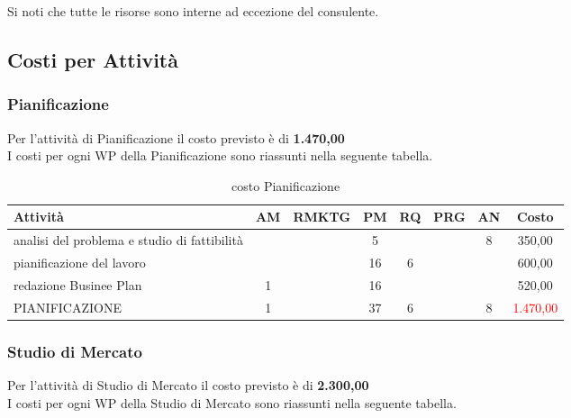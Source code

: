 Si noti che tutte le risorse sono interne ad eccezione del consulente. 











\subsection{Costi per Attività}

	

\subsubsection{Pianificazione}
Per l'attività di Pianificazione il costo previsto è di \textbf{ \text{\euro}1.470,00 }\\	
I costi per ogni WP della Pianificazione sono riassunti nella seguente tabella.
\begin{table}[!h]
\centering
\begin{tabular}{|l|c|c|c|c|c|c|c|}
\hline
\textbf{Attività}& \textbf{AM} & \textbf{RMKTG} & \textbf{PM} & \textbf{RQ} & \textbf{PRG} & \textbf{AN} & \textbf{Costo}  \\ 
              
\hline
analisi del problema e studio di fattibilità  & & & 5& & & 8& \text{\euro} 350,00\\
pianificazione del lavoro	 				  & & &	16&	6& & & \text{\euro} 600,00 \\	
redazione Businee Plan						& 1 & &16& & & &  	\text{\euro} 520,00 \\			  
\hline
PIANIFICAZIONE   							& 1 & &37 &	6 &	&	8 &	\textcolor{red}{ \text{\euro}1.470,00 }\\		 
\hline
\end{tabular}
\caption{costo Pianificazione}\label{tab:pianificazione}
\end{table}
 


\subsubsection{Studio di Mercato}

Per l'attività di Studio di Mercato il costo previsto è di \textbf{ \text{\euro}2.300,00 }\\	
I costi per ogni WP della Studio di Mercato sono riassunti nella seguente tabella.


